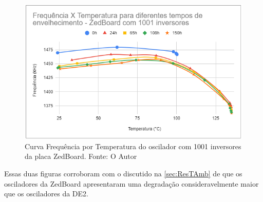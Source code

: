 \begin{figure}[H]
    \centering
    \includegraphics[scale=0.75]{figures/Resultados/FreqXTempZedBoard1001}
    \caption{Curva Frequência por Temperatura do oscilador com 1001 inversores da placa ZedBoard. Fonte: O Autor}
    \label{fig:FreqXTempZedBoard1001}
\end{figure}

Essas duas figuras corroboram com o discutido na \ref{sec:ResTAmb} de que os osciladores da ZedBoard apresentaram uma degradação consideravelmente maior que os osciladores da DE2.
